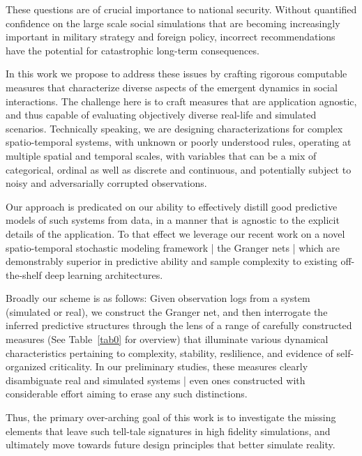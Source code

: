 \documentclass[onecolumn, compsoc,11pt]{IEEEtran}
\begin{document}
These questions are of crucial importance to national security. Without quantified confidence on the large scale social simulations that are becoming increasingly important in military strategy and foreign policy,  incorrect recommendations have the potential for  catastrophic long-term consequences.


In this work we propose to address these issues by crafting rigorous computable measures  that characterize diverse aspects of the  emergent dynamics in social interactions. The challenge here is to  craft measures that are application agnostic, and thus capable of evaluating  objectively  diverse real-life and simulated scenarios. Technically speaking, we are  designing characterizations for complex spatio-temporal systems, with unknown or poorly understood rules, operating at multiple spatial and temporal scales, with variables that can be a mix of categorical, ordinal as well as discrete and continuous, and potentially subject to noisy and  adversarially corrupted observations.

Our approach is predicated on our ability to effectively distill good predictive models of  such systems from data, in a manner that is agnostic to the explicit details of the application. To that effect we leverage our recent work on a novel  spatio-temporal stochastic modeling framework   | the Granger nets | which are  demonstrably superior in predictive ability and sample complexity to   existing off-the-shelf deep learning architectures.

Broadly our scheme is as follows: Given observation logs from a system (simulated or real), we construct the Granger net, and then interrogate the inferred predictive structures through the lens of a range of carefully constructed measures (See Table~\ref{tab0} for overview) that illuminate various  dynamical characteristics pertaining to complexity, stability, reslilience, and evidence of self-organized criticality. In our preliminary studies, these measures  clearly disambiguate real and simulated systems | even ones  constructed  with considerable  effort aiming to erase any such distinctions.

Thus, the primary over-arching goal of this work is to investigate the missing elements that  leave such tell-tale signatures in high fidelity simulations, and ultimately move towards future design principles that better simulate reality.
%
\end{document}
